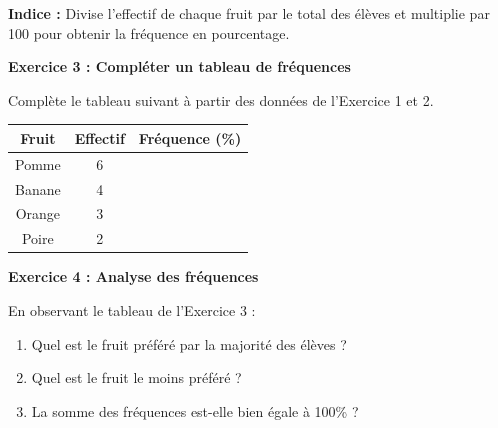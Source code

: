 \documentclass{article}
\begin{document}
\begin{tcolorbox}[colback=green!10!white, colframe=yellow!75!black, title=\textcolor{white}{Exercices}]
\textbf{Indice :} Divise l'effectif de chaque fruit par le total des élèves et multiplie par 100 pour obtenir la fréquence en pourcentage.

\vspace{0.35cm}

\textbf{Exercice 3 : Compléter un tableau de fréquences}

Complète le tableau suivant à partir des données de l'Exercice 1 et 2.

\begin{center}
\begin{tabular}{|c|c|c|}
\hline
Fruit & Effectif & Fréquence (\%) \\
\hline
Pomme & 6 &  \\
Banane & 4 &  \\
Orange & 3 &  \\
Poire & 2 &  \\
\hline
\end{tabular}
\end{center}

\vspace{0.35cm}

\textbf{Exercice 4 : Analyse des fréquences}

En observant le tableau de l'Exercice 3 :
\begin{enumerate}
    \item Quel est le fruit préféré par la majorité des élèves ?
    \item Quel est le fruit le moins préféré ?
    \item La somme des fréquences est-elle bien égale à 100\% ?
\end{enumerate}

\end{tcolorbox}
\end{document}
